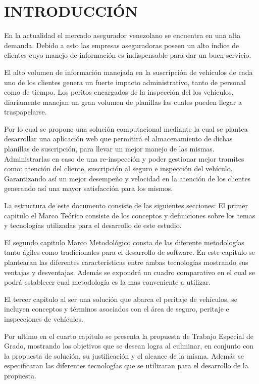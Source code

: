 \chapter*{INTRODUCCIÓN}


\setlength{\parskip}{4mm}

En la actualidad el mercado asegurador venezolano se encuentra en una alta demanda. Debido a esto las empresas aseguradoras poseen un alto índice de clientes cuyo manejo de información es indispensable para dar un buen servicio.

El alto volumen de información manejada en la suscripción de vehículos de cada uno de los clientes genera un fuerte impacto administrativo, tanto de personal como de tiempo. Los peritos encargados de la inspección del los vehículos, diariamente manejan un gran volumen de planillas las cuales pueden llegar a traspapelarse.

Por lo cual se propone una solución computacional mediante la cual se plantea desarrollar una aplicación web que permitirá el almacenamiento de dichas planillas de suscripción, para llevar un mejor manejo de las mismas. Administrarlas en caso de una re-inspección y poder gestionar mejor tramites como: atención del cliente, suscripción al seguro e inspección del vehículo. Garantizando así un mejor desempeño y velocidad en la atención de los clientes generando así una mayor satisfacción para los mismos.

La estructura de este documento consiste de las siguientes secciones: El primer capitulo el Marco Teórico consiste de los conceptos y definiciones sobre los temas y tecnologías utilizadas para el desarrollo de este estudio. 

El segundo capitulo Marco Metodológico consta de las diferente metodologías tanto ágiles como tradicionales para el desarrollo de software. En este capitulo se plantearan las diferentes características entre ambas tecnologías mostrando sus ventajas y desventajas. Además se expondrá un cuadro comparativo en el cual se podrá establecer cual metodología es la mas conveniente a utilizar.

El tercer capitulo al ser una solución que abarca el peritaje de vehículos, se incluyen conceptos y términos asociados con el área de seguro, peritaje e inspecciones de vehículos.

Por ultimo en el cuarto capitulo se presenta la propuesta de Trabajo Especial de Grado, mostrando los objetivos que se desean logra al culminar, en conjunto con la propuesta de solución, su justificación y el alcance de la misma. Además se especificaran las diferentes tecnologías que se utilizaran para el desarrollo de la propuesta.
\setlength{\parskip}{0mm}
